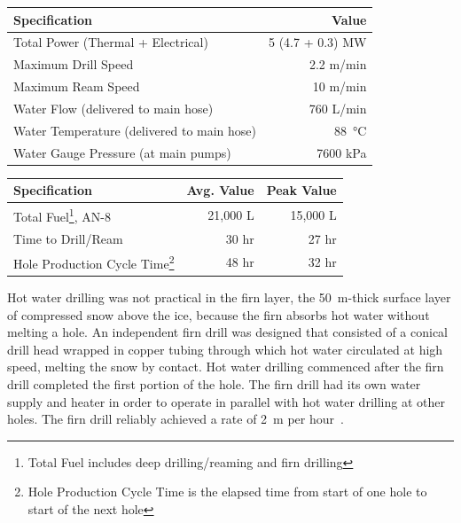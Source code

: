 \begin{minipage}{\textwidth}
  \centering {}
  \begin{tabular}{ l  r }
 \hline
    Specification & Value \\ \hline Total Power (Thermal + Electrical)
    & 5 (4.7 + 0.3) MW \\ Maximum Drill Speed & 2.2 m/min \\ Maximum Ream
    Speed & 10 m/min \\ Water Flow (delivered to main hose) & 760 L/min
    \\ Water Temperature (delivered to main hose) & \SI{88}{\celsius}
    \\ Water Gauge Pressure (at main pumps) & 7600 kPa\\
 \hline
  \end{tabular} 
  \label{tab:ehwd_system}
\end{minipage}
\vspace{\baselineskip}

\begin{minipage}{\textwidth}
  \centering {}
  \begin{tabular}{ l  r  r }
\hline
    Specification & Avg. Value & Peak Value\\ 
\hline 
Total Fuel\footnote{Total Fuel includes deep drilling/reaming and firn
      drilling}, AN-8 & 21,000 L & 15,000 L \\ Time to Drill/Ream & 30 hr&
    27 hr \\ Hole Production Cycle Time\footnote{Hole Production Cycle Time
      is the elapsed time from start of one hole to start of the next hole}
    & 48 hr & 32 hr \\
\hline
    \end{tabular}
  
  \label{tab:ehwd_system_peak}
\end{minipage}
\vspace{\baselineskip}

Hot water drilling was not practical in the firn layer, the 50~m-thick surface layer of
compressed snow above the ice, because the firn
absorbs hot water without melting a hole.  An independent
firn drill was designed that consisted of a conical drill
head wrapped in copper tubing through which hot water circulated at high speed,
melting the snow by contact. Hot water drilling commenced after the firn
drill completed the first portion of the hole. The firn drill had its own
water supply and heater in order to operate in parallel with hot water drilling
at other holes. The firn drill reliably achieved a rate of 2~m per hour~\cite{ehwd}.

